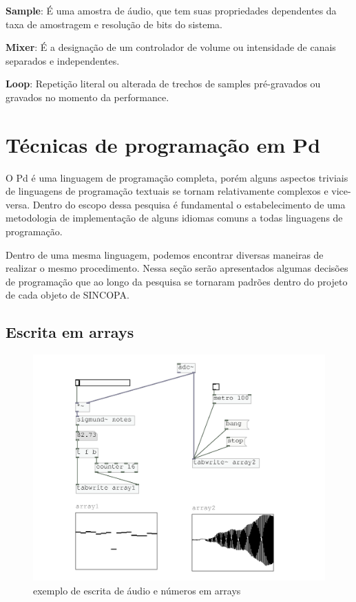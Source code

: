 \documentclass[draft]{ppgmus}
\begin{document}
\textbf{Sample}: É uma amostra de áudio, que tem suas propriedades dependentes da
taxa de amostragem e resolução de bits do sistema.


\textbf{Mixer}: É a designação de um controlador de volume ou intensidade de canais separados 
e independentes.

\textbf{Loop}: Repetição literal ou alterada de trechos de samples pré-gravados ou
gravados no momento da performance.

\section{Técnicas de programação em Pd}
\label{tecnicas}


O Pd é uma linguagem de programação completa, porém alguns aspectos triviais
de linguagens de programação textuais se tornam relativamente complexos e vice-versa.
Dentro do escopo dessa pesquisa é fundamental o estabelecimento de uma metodologia de
implementação de alguns idiomas comuns a todas linguagens de programação.

Dentro de uma mesma linguagem, podemos encontrar diversas maneiras
de realizar o mesmo procedimento. Nessa seção serão apresentados algumas decisões de programação 
que ao longo da pesquisa se tornaram padrões dentro do projeto de cada
objeto de SINCOPA.
 
\subsection{Escrita em arrays}

\begin{figure}
\includegraphics[scale=.6]{escrita-array}
\caption{exemplo de escrita de áudio e números em arrays}
\label{escritaarray}
\end{figure}
\end{document}
